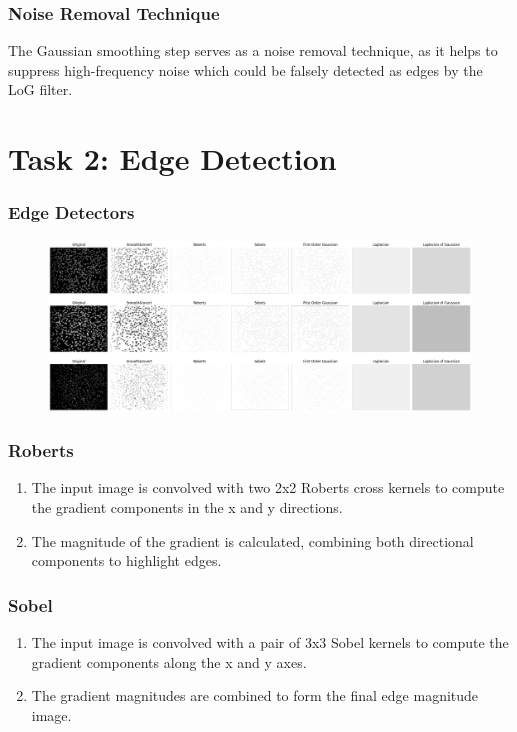 \documentclass[11pt]{article}
\begin{document}
\subsubsection*{Noise Removal Technique}
The Gaussian smoothing step serves as a noise removal technique, as it helps to suppress high-frequency noise which could be falsely detected as edges by the LoG filter. 

\section*{Task 2: Edge Detection}

\subsubsection*{Edge Detectors}

\begin{figure}[h]
    \centering
    \includegraphics[width=\textwidth]{../img/task2_cells.png}
\end{figure}

\subsubsection*{Roberts}
\begin{enumerate}
    \item The input image is convolved with two 2x2 Roberts cross kernels to compute the gradient components in the x and y directions.
    \item The magnitude of the gradient is calculated, combining both directional components to highlight edges.
\end{enumerate}

\subsubsection*{Sobel}
\begin{enumerate}
    \item The input image is convolved with a pair of 3x3 Sobel kernels to compute the gradient components along the x and y axes.
    \item The gradient magnitudes are combined to form the final edge magnitude image.
\end{enumerate}
\end{document}
